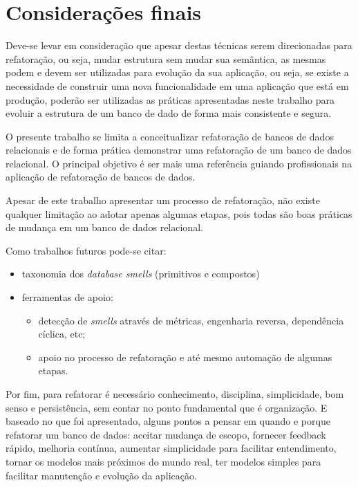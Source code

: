 \documentclass[10pt]{article}
\begin{document}
\section{Considerações finais}\label{sec:consideracoes}

	Deve-se levar em consideração que apesar destas técnicas serem direcionadas para refatoração, ou seja, mudar estrutura sem mudar sua semântica, as mesmas podem e devem ser utilizadas para evolução da sua aplicação, ou seja, se existe a necessidade de construir uma nova funcionalidade em uma aplicação que está em produção, poderão ser utilizadas as práticas apresentadas neste trabalho para evoluir a estrutura de um banco de dado de forma mais consistente e segura.

    O presente trabalho se limita a conceitualizar refatoração de bancos de dados relacionais e de forma prática demonstrar uma refatoração de um banco de dados relacional. O principal objetivo é ser mais uma referência guiando profissionais na aplicação de refatoração de bancos de dados.
    
    Apesar de este trabalho apresentar um processo de refatoração, não existe qualquer limitação ao adotar apenas algumas etapas, pois todas são boas práticas de mudança em um banco de dados relacional.
    
    Como trabalhos futuros pode-se citar:
    \begin{itemize}
        \item taxonomia dos \textit{database smells} (primitivos e compostos)
        \item ferramentas de apoio:
            \begin{itemize}
                \item detecção de \textit{smells} através de métricas, engenharia reversa, dependência cíclica, etc;
                \item apoio no processo de refatoração e até mesmo automação de algumas etapas.
            \end{itemize}
    \end{itemize}

    Por fim, para refatorar é necessário conhecimento, disciplina, simplicidade, bom senso e persistência, sem contar no ponto fundamental que é organização. E baseado no que foi apresentado, alguns pontos a pensar em quando e porque refatorar um banco de dados: aceitar mudança de escopo, fornecer feedback rápido, melhoria contínua, aumentar simplicidade para facilitar entendimento, tornar os modelos mais próximos do mundo real, ter modelos simples para facilitar manutenção e evolução da aplicação.

\renewcommand\refname{Referências}



\end{document}
